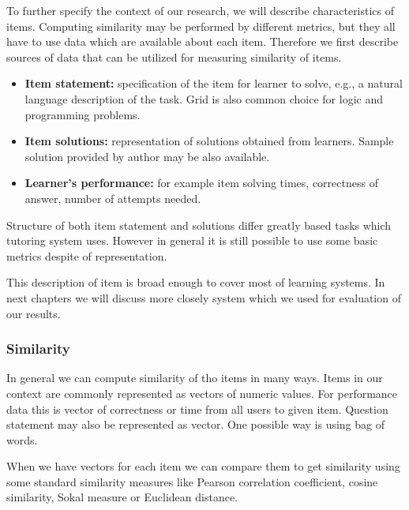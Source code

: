 \documentclass[
  digital, %
  table,   %
  nolof,     %
  nolot,     %
  nocover
]{fithesis3}
\begin{document}

To further specify the context of our research, we will describe
characteristics of items. Computing similarity may be performed by different metrics, but they all have to use data which are available about each item. Therefore we first describe
sources of data that can be utilized for measuring similarity of items.

\begin{itemize}
\item
  \textbf{Item statement:} specification of the item for learner
  to solve, e.g., a natural language description of the task. Grid is also common choice for logic and programming problems.
\item
  \textbf{Item solutions:} representation of solutions obtained from
  learners. Sample solution provided by author may be also available.
\item
  \textbf{Learner's performance:} for example item solving times,
  correctness of answer, number of attempts needed.
\end{itemize}

Structure of both item statement and solutions differ greatly based tasks which tutoring system uses. However in general it is still possible to use some basic metrics despite of representation.

This description of item is broad enough to cover most of learning
systems. In next chapters we will discuss more closely system which we used for evaluation of our results.

\subsubsection{Similarity}\label{similarity}


In general we can compute similarity of tho items in many ways. Items in our context are commonly represented as vectors of numeric values. For performance data this is vector of correctness or time from all users to given item. Question statement may also be represented as vector. One possible way is using bag of words.

When we have vectors for each item we can compare them to get similarity using some standard similarity measures like Pearson correlation coefficient, cosine similarity, Sokal measure or Euclidean distance.

\end{document}
